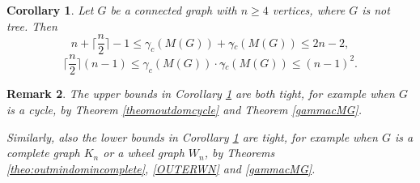 \documentclass[a4paper,12pt, reqno]{amsart}
\newtheorem{Theorem}{Theorem}[section]
\newtheorem{Corollary}[Theorem]{Corollary}
\newtheorem{Remark}[Theorem]{Remark}
\begin{document}
%
\begin{Corollary} \label{gammacandoutgamma}
	Let $G$ be a connected graph with $n\ge4$ vertices, where $G$ is not tree. Then $$n+\lceil\frac{n}{2}\rceil-1 \le \gamma _{c}(M(G))+\gamma{\tilde{}} _{c}(M(G))\le 2n-2,$$
	$$\lceil\frac{n}{2}\rceil(n-1) \le \gamma _{c}(M(G))\cdot\gamma{\tilde{}} _{c}(M(G))\le (n-1)^{2}.$$
\end{Corollary}
\begin{Remark}
	The upper bounds in Corollary \ref{gammacandoutgamma} are both tight, for example when $G$ is a cycle, by Theorem \ref{theomoutdomcycle} and Theorem \ref{gammacMG}.

	Similarly, also the lower bounds in Corollary \ref{gammacandoutgamma} are tight, for example when $G$ is a complete graph $K_n$ or a wheel graph $W_n$, by Theorems \ref{theo:outmindomincomplete}, \ref{OUTERWN} and \ref{gammacMG}.
\end{Remark}
\end{document}
